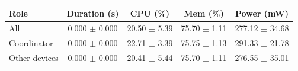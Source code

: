 \begin{tabular}{lcccc}
\hline
\textbf{Role} & \textbf{Duration (s)} & \textbf{CPU (\%)} & \textbf{Mem (\%)} & \textbf{Power (mW)} \\
\hline
All & 0.000 $\pm$ 0.000 & 20.50 $\pm$ 5.39 & 75.70 $\pm$ 1.11 & 277.12 $\pm$ 34.68 \\
Coordinator & 0.000 $\pm$ 0.000 & 22.71 $\pm$ 3.39 & 75.75 $\pm$ 1.13 & 291.33 $\pm$ 21.78 \\
Other devices & 0.000 $\pm$ 0.000 & 20.41 $\pm$ 5.44 & 75.70 $\pm$ 1.11 & 276.55 $\pm$ 35.01 \\
\hline
\end{tabular}
